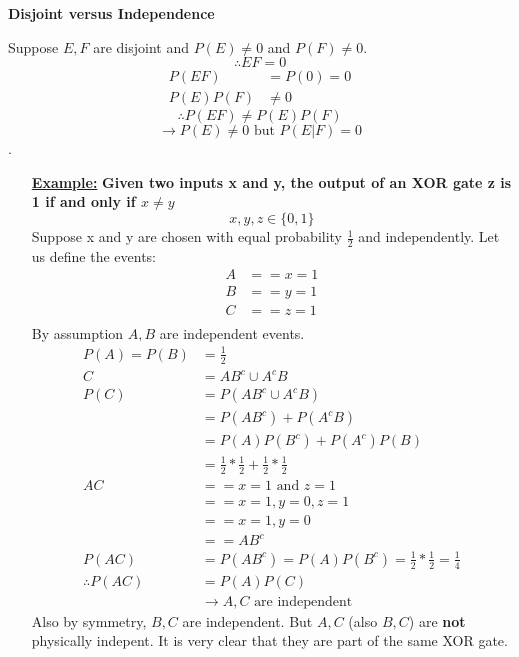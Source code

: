 \documentclass[10pt]{article}
\begin{document}
\begin{flushleft}
        \begin{center}
            \textbf{Disjoint versus Independence}
        \end{center}
        Suppose $E, F$ are disjoint and $P(E) \neq 0$ and $P(F) \neq 0$.
        $$ \therefore EF = 0 $$
        $$ \begin{aligned}
            P(EF) &= P(0) = 0 \\
            P(E)P(F) &\neq 0
        \end{aligned} $$
        $$ \therefore P(EF) \neq P(E)P(F) $$
        $$ \rightarrow P(E) \neq 0 \text{ but } P(E|F) = 0$$.

        \newpage

\begin{itemize}
    \item[\textbf{\underline{Example:}}] \textbf{Given two inputs x and y, the
        output of an XOR gate z is 1 if and only if $x \neq y$}
        $$ x, y, z \in \{0, 1\} $$
        Suppose x and y are chosen with equal probability $\frac{1}{2}$ and
        independently. Let us define the events:
        $$ \begin{aligned}
            A &== x = 1 \\
            B &== y = 1 \\
            C &== z = 1 \\
        \end{aligned} $$
        By assumption $A, B$ are independent events.
        $$ \begin{aligned}
            P(A) = P(B) &= \frac{1}{2} \\
            C &= AB^c \cup A^cB \\
            P(C) &= P(AB^c \cup A^cB) \\
                 &= P(AB^c) + P(A^cB) \\
                 &= P(A)P(B^c) + P(A^c)P(B) \\
                 &= \frac{1}{2} * \frac{1}{2} + \frac{1}{2} * \frac{1}{2} \\
            AC &== x = 1 \text{ and } z = 1 \\
               &== x = 1, y = 0, z = 1 \\
               &== x = 1, y = 0 \\
               &== AB^c \\
            P(AC) &= P(AB^c) = P(A)P(B^c) = \frac{1}{2} * \frac{1}{2} =
            \frac{1}{4} \\
            \therefore P(AC) &= P(A)P(C) \\
                             &\rightarrow A, C \text{ are independent}
        \end{aligned} $$
        Also by symmetry, $B, C$ are independent. But $A, C$ (also $B, C$) are
        \textbf{not} physically indepent. It is very clear that they are part of the
        same XOR gate.
\end{itemize}


\end{flushleft}
\end{document}
